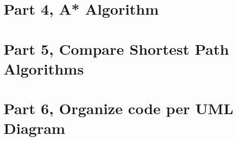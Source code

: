 \documentclass{article}
\begin{document}
\begin{onehalfspace}
\section*{Part 4, A* Algorithm}
\newpage

\section*{Part 5, Compare Shortest Path Algorithms}
\newpage

\section*{Part 6, Organize code per UML Diagram}


\end{onehalfspace}
\end{document}
